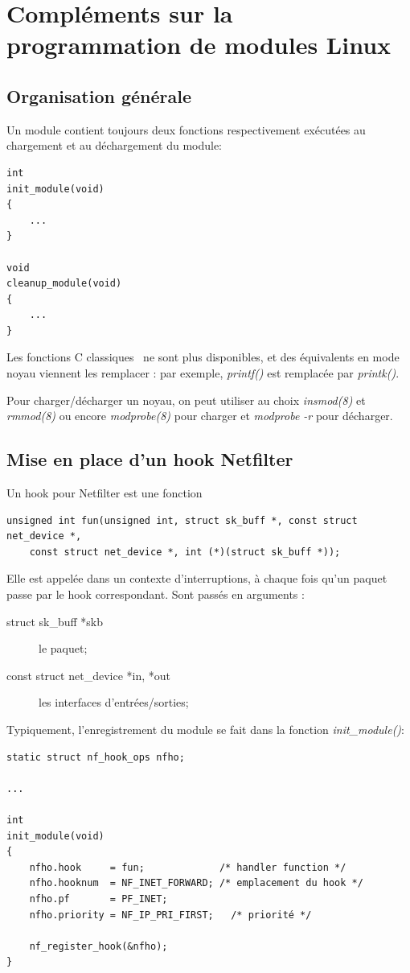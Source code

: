 \documentclass[a4paper]{article}
\begin{document}
\newpage
\appendix

\section{Compléments sur la programmation de modules Linux}
\subsection{Organisation générale}
Un module contient toujours deux fonctions respectivement exécutées
au chargement et au déchargement du module:
\begin{verbatim}
int
init_module(void)
{
    ...
}

void
cleanup_module(void)
{
    ...
}
\end{verbatim}

Les fonctions C \og classiques \fg\ ne sont plus disponibles, et
des équivalents en mode noyau viennent les remplacer : par exemple,
\textit{printf()} est remplacée par \textit{printk()}.

Pour charger/décharger un noyau, on peut utiliser au choix
\textit{insmod(8)} et \textit{rmmod(8)} ou encore \textit{modprobe(8)} pour charger et \textit{modprobe -r} pour décharger.

\subsection{Mise en place d'un hook Netfilter}
Un hook pour Netfilter est une fonction
\begin{verbatim}
unsigned int fun(unsigned int, struct sk_buff *, const struct net_device *,
	const struct net_device *, int (*)(struct sk_buff *));
\end{verbatim}

Elle est appelée dans un contexte d'interruptions, à chaque
fois qu'un paquet passe par le hook correspondant. Sont passés en arguments :
\begin{description}
	\item[struct sk\_buff *skb] le paquet;
	\item[const struct net\_device *in, *out] les interfaces d'entrées/sorties;
\end{description}

Typiquement, l'enregistrement du module se fait dans la fonction
\textit{init\_module()}:
\begin{verbatim}
static struct nf_hook_ops nfho;

...

int
init_module(void)
{
    nfho.hook     = fun;             /* handler function */
    nfho.hooknum  = NF_INET_FORWARD; /* emplacement du hook */
    nfho.pf       = PF_INET;
    nfho.priority = NF_IP_PRI_FIRST;   /* priorité */

    nf_register_hook(&nfho);
}
\end{verbatim}
\end{document}
